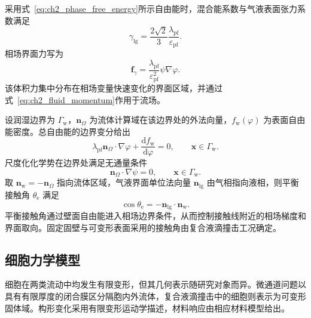 采用式~\eqref{eq:ch2_phase_free_energy}所示自由能时，混合能系数与气液表面张力系数满足
\begin{equation}
\gamma_{\mathrm{lg}}
=
\frac{2\sqrt{2}}{3}
\frac{\lambda_{\mathrm{pf}}}{\varepsilon_{\mathrm{pf}}}.
\label{eq:ch2_surface_tension_relation}
\end{equation}
相场界面力写为
\begin{equation}
\boldsymbol{f}_{\gamma}
=
\frac{\lambda_{\mathrm{pf}}}{\varepsilon_{\mathrm{pf}}^2}
\psi\nabla\varphi.
\label{eq:ch2_phase_surface_force}
\end{equation}
该体积力集中分布在相场变量快速变化的界面区域，并通过式~\eqref{eq:ch2_fluid_momentum}作用于流场。

设润湿边界为 $\Gamma_{\mathrm w}$，$\boldsymbol{n}_{\Omega}$ 为流体计算域在该边界处的外法向量，$f_{\mathrm w}(\varphi)$ 为表面自由能密度。总自由能的边界变分给出
\begin{equation}
\lambda_{\mathrm{pf}}
\boldsymbol{n}_{\Omega}\cdot\nabla\varphi
+
\frac{\mathrm df_{\mathrm w}}{\mathrm d\varphi}
=0,
\qquad
\boldsymbol{x}\in\Gamma_{\mathrm w}.
\label{eq:ch2_wetting_bc}
\end{equation}
尺度化化学势在边界处满足无通量条件
\begin{equation}
\boldsymbol{n}_{\Omega}\cdot\nabla\psi=0,
\qquad
\boldsymbol{x}\in\Gamma_{\mathrm w}.
\label{eq:ch2_chemical_no_flux}
\end{equation}
取 $\boldsymbol{n}_{\mathrm w}=-\boldsymbol{n}_{\Omega}$ 指向流体区域，气液界面单位法向量 $\boldsymbol{n}_{\mathrm{lg}}$ 由气相指向液相，则平衡接触角 $\theta_{\mathrm e}$ 满足
\begin{equation}
\cos\theta_{\mathrm e}
=
-\boldsymbol{n}_{\mathrm{lg}}\cdot\boldsymbol{n}_{\mathrm w}.
\label{eq:ch2_contact_angle_geometry}
\end{equation}
平衡接触角通过壁面自由能进入相场边界条件，从而控制接触线附近的相场梯度和界面取向。固定固壁与可变形表面采用的接触角由复合液滴撞击工况确定\cite{deGennes1985wetting,bonn2009wetting,snoeijer2013moving}。

\subsection{细胞力学模型}
\label{subsec:ch2_cell_mechanics}

细胞在两类流动中均发生有限变形，但其几何表示随研究对象而异。微通道问题以具有有限厚度的闭合膜区分隔胞内外流体，复合液滴撞击中的细胞则表示为可变形固体域。构形变化采用有限变形运动学描述，材料响应由相应材料模型给出。

